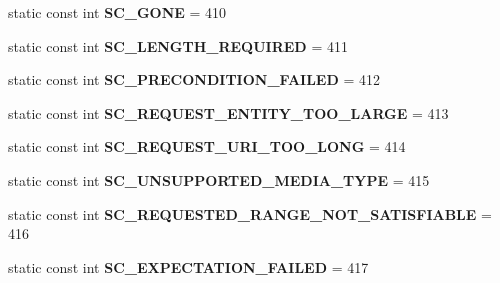 \begin{DoxyCompactItemize}
\item 
\mbox{\label{class_http_servlet_response_a63390c4a11859e6f638cedfeb34e05e2}} 
static const int {\bfseries S\+C\+\_\+\+G\+O\+NE} = 410
\item 
\mbox{\label{class_http_servlet_response_aa92564f0261fc9ad79af73d9f5768f36}} 
static const int {\bfseries S\+C\+\_\+\+L\+E\+N\+G\+T\+H\+\_\+\+R\+E\+Q\+U\+I\+R\+ED} = 411
\item 
\mbox{\label{class_http_servlet_response_a92df03e647616e83e5cde10ebd423619}} 
static const int {\bfseries S\+C\+\_\+\+P\+R\+E\+C\+O\+N\+D\+I\+T\+I\+O\+N\+\_\+\+F\+A\+I\+L\+ED} = 412
\item 
\mbox{\label{class_http_servlet_response_a257564cdbe543f536fc5c2fdc63e4c2c}} 
static const int {\bfseries S\+C\+\_\+\+R\+E\+Q\+U\+E\+S\+T\+\_\+\+E\+N\+T\+I\+T\+Y\+\_\+\+T\+O\+O\+\_\+\+L\+A\+R\+GE} = 413
\item 
\mbox{\label{class_http_servlet_response_a29f723e32b2cddb7c7fe2849b294c059}} 
static const int {\bfseries S\+C\+\_\+\+R\+E\+Q\+U\+E\+S\+T\+\_\+\+U\+R\+I\+\_\+\+T\+O\+O\+\_\+\+L\+O\+NG} = 414
\item 
\mbox{\label{class_http_servlet_response_af55bcf82a105cf67cdd2cab4eb90aeb4}} 
static const int {\bfseries S\+C\+\_\+\+U\+N\+S\+U\+P\+P\+O\+R\+T\+E\+D\+\_\+\+M\+E\+D\+I\+A\+\_\+\+T\+Y\+PE} = 415
\item 
\mbox{\label{class_http_servlet_response_a1e8d6fd9ee1a811b56a37fae277a44e7}} 
static const int {\bfseries S\+C\+\_\+\+R\+E\+Q\+U\+E\+S\+T\+E\+D\+\_\+\+R\+A\+N\+G\+E\+\_\+\+N\+O\+T\+\_\+\+S\+A\+T\+I\+S\+F\+I\+A\+B\+LE} = 416
\item 
\mbox{\label{class_http_servlet_response_ad016ef8732d38ae6ee05a9dd83dddff8}} 
static const int {\bfseries S\+C\+\_\+\+E\+X\+P\+E\+C\+T\+A\+T\+I\+O\+N\+\_\+\+F\+A\+I\+L\+ED} = 417
\item 
\mbox{\label{class_http_servlet_response_a0aac7f8bb706e75f4cbc0ad89c2197d1}} 

\end{DoxyCompactItemize}

